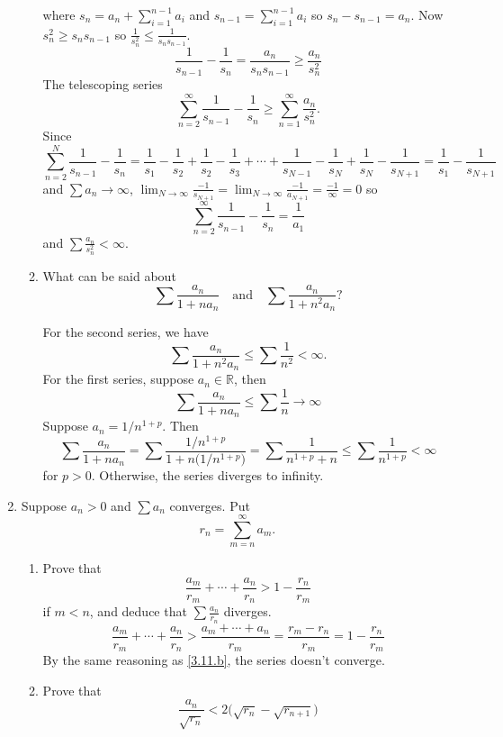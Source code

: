\begin{enumerate}
\begin{enumerate}[label = (\alph*), ref = \theenumi{} (\alph*)]
\[    \]
    where \(s_n = a_n + \sum_{i = 1}^{n - 1}a_i\) and
    \(s_{n - 1} = \sum_{i = 1}^{n - 1}a_i\) so \(s_n - s_{n - 1} = a_n\).
    Now \(s_n^2\geq s_ns_{n - 1}\) so
    \(\frac{1}{s_n^2}\leq\frac{1}{s_ns_{n - 1}}\).
    \[
    \frac{1}{s_{n - 1}} - \frac{1}{s_n} = \frac{a_n}{s_ns_{n - 1}}\geq
    \frac{a_n}{s_n^2}
    \]
    The telescoping series
    \[
    \sum_{n = 2}^{\infty}\frac{1}{s_{n - 1}} - \frac{1}{s_n}\geq
    \sum_{n = 1}^{\infty}\frac{a_n}{s_n^2}.
    \]
    Since
    \[
    \sum_{n = 2}^N\frac{1}{s_{n - 1}} - \frac{1}{s_n} =
    \frac{1}{s_1} - \frac{1}{s_2} + \frac{1}{s_2} - \frac{1}{s_3} + \cdots +
    \frac{1}{s_{N - 1}} - \frac{1}{s_N} + \frac{1}{s_N} - \frac{1}{s_{N + 1}}
    = \frac{1}{s_1} - \frac{1}{s_{N + 1}}
    \]
    and \(\sum a_n\to\infty\), \(\lim_{N\to\infty}\frac{-1}{s_{N + 1}} =
    \lim_{N\to\infty}\frac{-1}{a_{N + 1}} = \frac{-1}{\infty} = 0\) so
    \[
    \sum_{n = 2}^{\infty}\frac{1}{s_{n - 1}} - \frac{1}{s_n} = \frac{1}{a_1}
    \]
    and \(\sum\frac{a_n}{s_n^2} < \infty\).
  \item
    What can be said about
    \[
    \sum\frac{a_n}{1 + na_n}\quad\text{and}\quad\sum\frac{a_n}{1 + n^2a_n}
    \mbox{?}
    \]
    \par\smallskip
    For the second series, we have
    \[
    \sum\frac{a_n}{1 + n^2a_n}\leq\sum\frac{1}{n^2} < \infty.
    \]
    For the first series, suppose \(a_n\in\mathbb{R}\), then
    \[
    \sum\frac{a_n}{1 + na_n}\leq\sum\frac{1}{n}\to\infty
    \]
    Suppose \(a_n = 1/n^{1 + p}\).
    Then
    \[
    \sum\frac{a_n}{1 + na_n} =
    \sum\frac{1/n^{1 + p}}{1 + n\bigl(1/n^{1 + p}\bigr)} =
    \sum\frac{1}{n^{1 + p} + n}\leq\sum\frac{1}{n^{1 + p}} < \infty
    \]
    for \(p > 0\).
    Otherwise, the series diverges to infinity.
  \end{enumerate}
\item
  Suppose \(a_n > 0\) and \(\sum a_n\) converges.
  Put
  \[
  r_n = \sum_{m = n}^{\infty}a_m.
  \]
  \begin{enumerate}[label = (\alph*)]
  \item
    Prove that
    \[
    \frac{a_m}{r_m} + \cdots + \frac{a_n}{r_n} > 1 - \frac{r_n}{r_m}
    \]
    if \(m < n\), and deduce that \(\sum\frac{a_n}{r_n}\) diverges.
    \[
    \frac{a_m}{r_m} + \cdots + \frac{a_n}{r_n} >
    \frac{a_m + \cdots + a_n}{r_m} = \frac{r_m - r_n}{r_m} =
    1 - \frac{r_n}{r_m}
    \]
    By the same reasoning as \cref{3.11.b}, the series doesn't converge.
  \item
    Prove that
    \[
    \frac{a_n}{\sqrt{r_n}} < 2\bigl(\sqrt{r_n} - \sqrt{r_{n + 1}}\bigr)
\]
\end{enumerate}
\end{enumerate}
